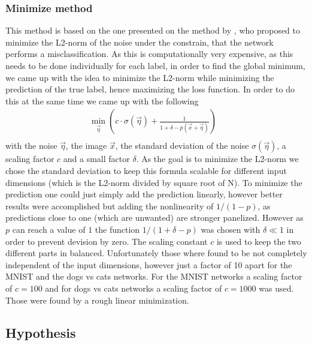 \documentclass[%
 reprint,
 amsmath,amssymb,
 aps,
]{revtex4-1}
\begin{document}
\subsubsection*{Minimize method}
This method is based on the one presented on the method by \citeauthor{paperMinimize}, who proposed to minimize the L2-norm of the noise under the constrain, that the network performs a misclassification. As this is computationally very expensive, as this needs to be done individually for each label, in order to find the global minimum, we came up with the idea to minimize the L2-norm while minimizing the prediction of the true label, hence maximizing the loss function. In order to do this at the same time we came up with the following
\begin{align}
\min_{\vec{\eta}} \left( c \cdot \sigma(\vec{\eta}) + \frac{1}{1 + \delta - p(\vec{x}+\vec{\eta})} \right) & \label{eq:minimize}\\
\end{align}
with the noise $\vec{\eta}$, the image $\vec{x}$, the standard deviation of the noise $\sigma (\vec{\eta})$, a scaling factor $c$ and a small factor $\delta$. As the goal is to minimize the L2-norm we chose the standard deviation to keep this formula scalable for different input dimensions (which is the L2-norm divided by square root of N). To minimize the prediction one could just simply add the prediction linearly, however better results were accomplished but adding the nonlinearity of $1/(1-p)$, as predictions close to one (which are unwanted) are stronger panelized. However as $p$ can reach a value of $1$ the function $1/(1 + \delta - p)$ was chosen with $\delta \ll 1$ in order to prevent devision by zero. The scaling constant $c$ is used to keep the two different parts in balanced. Unfortunately those where found to be not completely independent of the input dimensions, however just a factor of 10 apart for the MNIST and the dogs vs cats networks. For the MNIST networks a scaling factor of $c = 100$ and for dogs vs cats networks a scaling factor of $c = 1000$ was used. Those were found by a rough linear minimization.

\subsection{Hypothesis}
\end{document}
